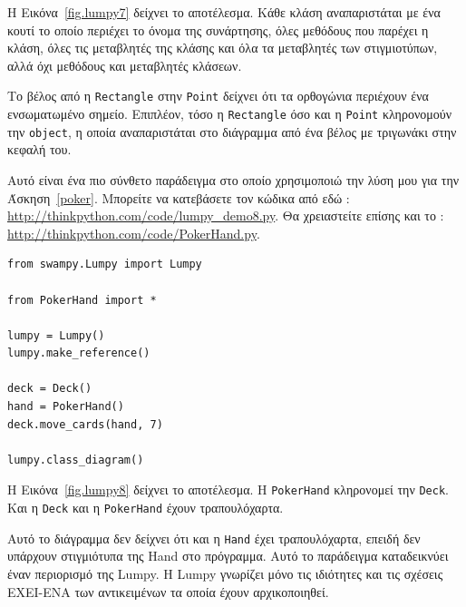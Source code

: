 \documentclass[10pt]{book}
\begin{document}
 Η Εικόνα~\ref{fig.lumpy7} δείχνει το αποτέλεσμα. Κάθε κλάση αναπαριστάται με ένα κουτί το οποίο περιέχει το όνομα της συνάρτησης, όλες μεθόδους που παρέχει η κλάση, όλες τις μεταβλητές της κλάσης και όλα τα μεταβλητές των στιγμιοτύπων, αλλά όχι μεθόδους και μεταβλητές κλάσεων.

Το βέλος από η  {\tt Rectangle}  στην  {\tt Point}  δείχνει ότι τα ορθογώνια περιέχουν ένα ενσωματωμένο σημείο.  Επιπλέον, τόσο η  {\tt Rectangle}  όσο και η  {\tt Point}  κληρονομούν την  {\tt object},  η οποία αναπαριστάται στο διάγραμμα από ένα βέλος με τριγωνάκι στην κεφαλή του.

Αυτό είναι ένα πιο σύνθετο παράδειγμα στο οποίο χρησιμοποιώ την λύση μου για την Άσκηση~\ref{poker}.  Μπορείτε να κατεβάσετε τον κώδικα από εδώ :  \url{http://thinkpython.com/code/lumpy_demo8.py}.   Θα χρειαστείτε επίσης και το  : \url{http://thinkpython.com/code/PokerHand.py}.

\begin{verbatim}
from swampy.Lumpy import Lumpy

from PokerHand import *

lumpy = Lumpy()
lumpy.make_reference()

deck = Deck()
hand = PokerHand()
deck.move_cards(hand, 7)

lumpy.class_diagram()
\end{verbatim}

 Η Εικόνα~\ref{fig.lumpy8} δείχνει το αποτέλεσμα. Η  {\tt PokerHand}  κληρονομεί την  {\tt Deck}.   Και η  {\tt Deck}  και η  {\tt PokerHand}  έχουν τραπουλόχαρτα.

Αυτό το διάγραμμα δεν δείχνει ότι και η  {\tt Hand}  έχει τραπουλόχαρτα, επειδή δεν υπάρχουν στιγμιότυπα της  Hand  στο πρόγραμμα.  Αυτό το παράδειγμα 
καταδεικνύει έναν περιορισμό της  Lumpy.   Η  Lumpy  γνωρίζει μόνο τις ιδιότητες και τις σχέσεις ΕΧΕΙ-ΕΝΑ των αντικειμένων τα οποία έχουν αρχικοποιηθεί.

 
\printindex
\end{document}
